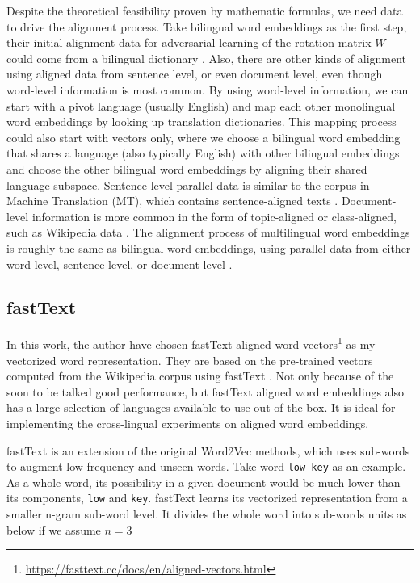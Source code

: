 \documentclass[thesis,fonts=libertine]{cluu}
\begin{document}
Despite the theoretical feasibility proven by mathematic formulas, we need data to drive the alignment process. Take bilingual word embeddings as the first step, their initial alignment data for adversarial learning of the rotation matrix $W$ could come from a bilingual dictionary \parencite{Mikolov:2013ac}. Also, there are other kinds of alignment using aligned data from sentence level, or even document level, even though word-level information is most common. By using word-level information, we can start with a pivot language (usually English) and map each other monolingual word embeddings by looking up translation dictionaries. This mapping process could also start with vectors only, where we choose a bilingual word embedding that shares a language (also typically English) with other bilingual embeddings and choose the other bilingual word embeddings by aligning their shared language subspace. Sentence-level parallel data is similar to the corpus in Machine Translation (MT), which contains sentence-aligned texts \parencite{Hermann:2013aa}. Document-level information is more common in the form of topic-aligned or class-aligned, such as Wikipedia data \parencite{vulic-moens-2013-study}. The alignment process of multilingual word embeddings is roughly the same as bilingual word embeddings, using parallel data from either word-level, sentence-level, or document-level \parencite{Ruder:2019aa}.

\subsection{fastText}
\label{sec:fasttext}

In this work, the author have chosen fastText aligned word vectors\footnote{\url{https://fasttext.cc/docs/en/aligned-vectors.html}} \parencite{Joulin:2018aa} as my vectorized word representation. They are based on the pre-trained vectors computed from the Wikipedia corpus using fastText \parencite{Bojanowski:2016aa}. Not only because of the soon to be talked good performance, but fastText aligned word embeddings also has a large selection of languages available to use out of the box. It is ideal for implementing the cross-lingual experiments on aligned word embeddings.

fastText is an extension of the original Word2Vec methods, which uses sub-words to augment low-frequency and unseen words. Take word \texttt{low-key} as an example. As a whole word, its possibility in a given document would be much lower than its components, \texttt{low} and \texttt{key}. fastText learns its vectorized representation from a smaller n-gram sub-word level. It divides the whole word into sub-words units as below if we assume $n=3$
\end{document}
